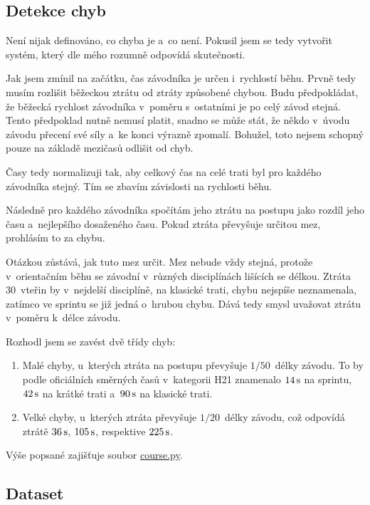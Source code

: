 \documentclass[a4paper,11pt]{article}
\begin{document}
\subsection*{Detekce chyb}

Není nijak definováno, co chyba je a~co není. Pokusil jsem se tedy vytvořit
systém, který dle mého rozumně odpovídá skutečnosti.

Jak jsem zmínil na začátku, čas závodníka je určen i~rychlostí běhu. Prvně tedy
musím rozlišit běžeckou ztrátu od ztráty způsobené chybou. Budu předpokládat, že
běžecká rychlost závodníka v~poměru s~ostatními je po celý závod stejná.
Tento předpoklad nutně nemusí platit, snadno se může stát, že někdo v~úvodu
závodu přecení své síly a~ke konci výrazně zpomalí. Bohužel, toto nejsem schopný
pouze na základě mezičasů odlišit od chyb.

Časy tedy normalizuji tak, aby celkový čas na celé trati byl pro každého
závodníka stejný. Tím se zbavím závislosti na rychlosti běhu.

Následně pro každého závodníka spočítám jeho ztrátu na postupu jako rozdíl jeho
času a~nejlepšího dosaženého času. Pokud ztráta převyšuje určitou mez, prohlásím
to za chybu.

Otázkou zůstává, jak tuto mez určit. Mez nebude vždy stejná, protože
v~orientačním běhu se závodní v~různých disciplínách lišících se délkou. Ztráta
30~vteřin by v~nejdelší disciplíně, na klasické trati, chybu nejspíše
neznamenala, zatímco ve sprintu se již jedná o~hrubou chybu. Dává tedy smysl
uvažovat ztrátu v~poměru k~délce závodu.

Rozhodl jsem se zavést dvě třídy chyb:
\begin{enumerate}
    \item Malé chyby, u~kterých ztráta na postupu převyšuje $1/50$~délky závodu.
    To by podle oficiálních směrných časů v~kategorii H21 znamenalo $14\,\rm s$
    na sprintu, $42\,\rm s$ na krátké trati a~$90\,\rm s$ na klasické trati.
    \item Velké chyby, u~kterých ztráta převyšuje $1/20$~délky závodu, což
    odpovídá ztrátě $36\,\rm s$, $105\,\rm s$, respektive $225\,\rm s$.
\end{enumerate}

Výše popsané zajišťuje soubor
\href{https://github.com/kulisak12/mistake-stats/blob/main/course.py}{course.py}.

\subsection*{Dataset}
\end{document}
